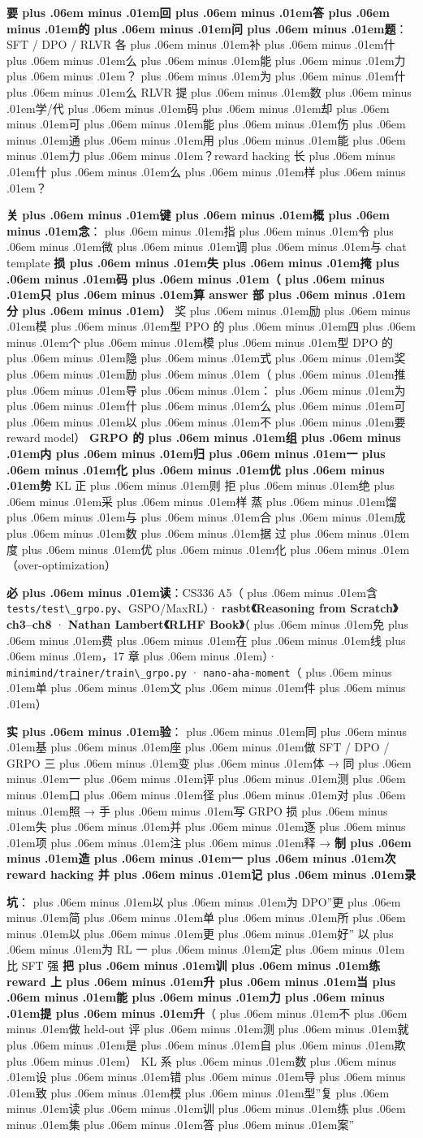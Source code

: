 \documentclass[
]{article}
\newcommand{\passthrough}[1]{#1}
\def\zh#1{{\zhfont #1}}
\def\sym#1{{\symfont #1}}
\def\zhglue{\hskip0pt plus .06em minus .01em}
\begin{document}
\textbf{\zh{要\zhglue 回\zhglue 答\zhglue 的\zhglue 问\zhglue 题}}\zh{：}SFT / DPO / RLVR \zh{各\zhglue 补\zhglue 什\zhglue 么\zhglue 能\zhglue 力\zhglue ？\zhglue 为\zhglue 什\zhglue 么} RLVR \zh{提\zhglue 数\zhglue 学}/\zh{代\zhglue 码\zhglue 却\zhglue 可\zhglue 能\zhglue 伤\zhglue 通\zhglue 用\zhglue 能\zhglue 力\zhglue ？}reward hacking \zh{长\zhglue 什\zhglue 么\zhglue 样\zhglue ？}

\textbf{\zh{关\zhglue 键\zhglue 概\zhglue 念}}\zh{：\zhglue 指\zhglue 令\zhglue 微\zhglue 调\zhglue 与} chat template \textbar{} \textbf{\zh{损\zhglue 失\zhglue 掩\zhglue 码\zhglue （\zhglue 只\zhglue 算} answer \zh{部\zhglue 分\zhglue ）}} \textbar{} \zh{奖\zhglue 励\zhglue 模\zhglue 型} \textbar{} PPO \zh{的\zhglue 四\zhglue 个\zhglue 模\zhglue 型} \textbar{} DPO \zh{的\zhglue 隐\zhglue 式\zhglue 奖\zhglue 励\zhglue （\zhglue 推\zhglue 导\zhglue ：\zhglue 为\zhglue 什\zhglue 么\zhglue 可\zhglue 以\zhglue 不\zhglue 要} reward model\zh{）}\textbar{} \textbf{GRPO \zh{的\zhglue 组\zhglue 内\zhglue 归\zhglue 一\zhglue 化\zhglue 优\zhglue 势}} \textbar{} KL \zh{正\zhglue 则} \textbar{} \zh{拒\zhglue 绝\zhglue 采\zhglue 样} \textbar{} \zh{蒸\zhglue 馏\zhglue 与\zhglue 合\zhglue 成\zhglue 数\zhglue 据} \textbar{} \zh{过\zhglue 度\zhglue 优\zhglue 化\zhglue （}over-optimization\zh{）}

\textbf{\zh{必\zhglue 读}}\zh{：}CS336 A5\zh{（\zhglue 含} \passthrough{\lstinline!tests/test\_grpo.py!}\zh{、}GSPO/MaxRL\zh{）}\sym{·} \textbf{rasbt\zh{《}Reasoning from Scratch\zh{》}ch3--ch8} \sym{·} \textbf{Nathan Lambert\zh{《}RLHF Book\zh{》}}\zh{（\zhglue 免\zhglue 费\zhglue 在\zhglue 线\zhglue ，}17 \zh{章\zhglue ）}\sym{·} \passthrough{\lstinline!minimind/trainer/train\_grpo.py!} \sym{·} \passthrough{\lstinline!nano-aha-moment!}\zh{（\zhglue 单\zhglue 文\zhglue 件\zhglue ）}

\textbf{\zh{实\zhglue 验}}\zh{：\zhglue 同\zhglue 基\zhglue 座\zhglue 做} SFT / DPO / GRPO \zh{三\zhglue 变\zhglue 体} \sym{→} \zh{同\zhglue 一\zhglue 评\zhglue 测\zhglue 口\zhglue 径\zhglue 对\zhglue 照} \sym{→} \zh{手\zhglue 写} GRPO \zh{损\zhglue 失\zhglue 并\zhglue 逐\zhglue 项\zhglue 注\zhglue 释} \sym{→} \textbf{\zh{制\zhglue 造\zhglue 一\zhglue 次} reward hacking \zh{并\zhglue 记\zhglue 录}}

\textbf{\zh{坑}}\zh{：\zhglue 以\zhglue 为} DPO''\zh{更\zhglue 简\zhglue 单\zhglue 所\zhglue 以\zhglue 更\zhglue 好}''\textbar{} \zh{以\zhglue 为} RL \zh{一\zhglue 定\zhglue 比} SFT \zh{强} \textbar{} \textbf{\zh{把\zhglue 训\zhglue 练} reward \zh{上\zhglue 升\zhglue 当\zhglue 能\zhglue 力\zhglue 提\zhglue 升}}\zh{（\zhglue 不\zhglue 做} held-out \zh{评\zhglue 测\zhglue 就\zhglue 是\zhglue 自\zhglue 欺\zhglue ）}\textbar{} KL \zh{系\zhglue 数\zhglue 设\zhglue 错\zhglue 导\zhglue 致\zhglue 模\zhglue 型}''\zh{复\zhglue 读\zhglue 训\zhglue 练\zhglue 集\zhglue 答\zhglue 案}''
\end{document}
